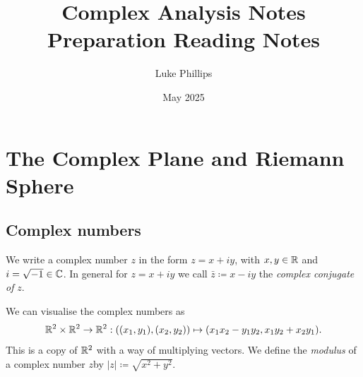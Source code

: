 \documentclass[10pt, a4paper]{article}
\title{Complex Analysis Notes \\
    \large Preparation Reading Notes}
\author{Luke Phillips}
\date{May 2025}
\begin{document}
\maketitle

\section{The Complex Plane and Riemann Sphere}

\subsection{Complex numbers}
We write a complex number $z$ in the form $z = x + iy$,
with $x, y \in \mathbb{R}$ and $i = \sqrt{-1} \in \mathbb{C}$.
In general for $z = x + iy$ we call $\bar{z} \coloneqq x - iy$ the \textit{complex conjugate of} $z$.


We can visualise the complex numbers as
\[
\mathbb{R} ^ 2 \times \mathbb{R} ^ 2 \rightarrow \mathbb{R} ^ 2 : ((x_1, y_1), (x_2, y_2)) \mapsto (x_1x_2 - y_1y_2, x_1y_2 + x_2y_1).
\]
This is a copy of $\mathbb{R} ^ 2$ with a way of multiplying vectors.
We define the \textit{modulus} of a complex number $z$by $|z| \coloneqq \sqrt{x ^ 2 + y ^ 2}$.
\end{document}
